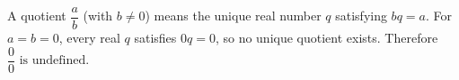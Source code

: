 A quotient $\dfrac{a}{b}$ (with $b\ne 0$) means the unique real number $q$ satisfying $bq=a$. For $a=b=0$, every real $q$ satisfies $0q=0$, so no unique quotient exists. Therefore $\boxed{\dfrac{0}{0}\text{ is undefined}}$.
